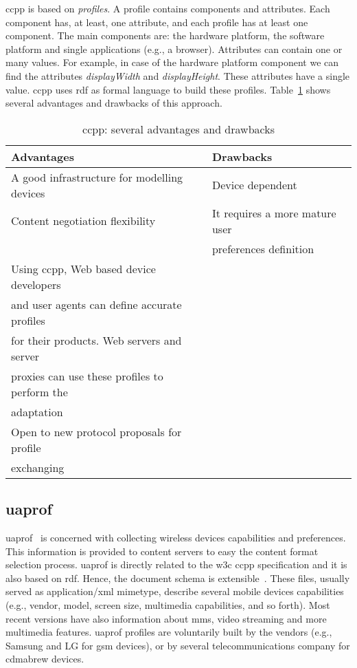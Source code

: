 \ac{ccpp} is based on \textit{profiles}. A profile contains components and attributes.
Each component has, at least, one attribute, and each profile has at least one
component. The main components are: the hardware platform, the software platform
and single applications (e.g., a browser). Attributes can contain one or many 
values. For example, in case of the hardware platform component we can find the 
attributes \textit{displayWidth} and \textit{displayHeight}. These attributes 
have a single value. \ac{ccpp} uses \ac{rdf} as formal language to build these 
profiles. Table~\ref{tbl:ccpp} shows several advantages and drawbacks of this 
approach.



\begin{table}
\caption{\ac{ccpp}: several advantages and drawbacks}
\label{tbl:ccpp}
\footnotesize
\centering
\begin{tabular}{l l}
  \hline
  \textbf{Advantages}				& \textbf{Drawbacks}			\\
  \hline
  A good infrastructure for modelling devices 	& Device dependent 			\\
  Content negotiation flexibility 		& It requires a more mature user 	\\
						& preferences definition 		\\
  Using \ac{ccpp}, Web based device developers	& 					\\
  and user agents can define accurate profiles 	&					\\
  for their products. Web servers and server 	&					\\
  proxies can use these profiles to perform the &					\\
  adaptation					&					\\
  Open to new protocol proposals for profile 	&					\\
  exchanging					&					\\
  \hline
\end{tabular}
\end{table}

\subsection{\ac{uaprof}}
\label{sec:uaprof}
\ac{uaprof}~\citep{uaprof} is concerned with collecting wireless devices 
capabilities and preferences. This information is provided to content servers 
to easy the content format selection process. \ac{uaprof} is directly related to 
the \ac{w3c} \ac{ccpp} specification and it is also based on \ac{rdf}. Hence, 
the document schema is extensible~\citep{butler_implementing_2001}\citep{butler_ccpp_2002}. 
These files, usually served as application/\ac{xml} mimetype, describe several mobile 
devices capabilities (e.g., vendor, model, screen size, multimedia capabilities, 
and so forth). Most recent versions have also information about \ac{mms}, video streaming 
and more multimedia features. \ac{uaprof} profiles are voluntarily built by the 
vendors (e.g., Samsung and LG for \acs{gsm} devices), or by several 
telecommunications company for \acs{cdmabrew} devices.

